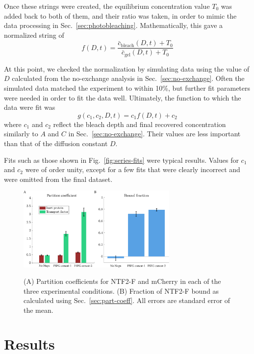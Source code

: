 Once these strings were created, the equilibrium concentration value $T_0$ was added back to both of them, and their ratio was taken, in order to mimic the data processing in Sec.~\ref{sec:photobleaching}.  Mathematically, this gave a normalized string of
\begin{equation}
f(D,t) = \frac{\bar{c}_\mathrm{bleach}(D,t)+T_0}{\bar{c}_\mathrm{gel}(D,t)+T_0}
\end{equation}

At this point, we checked the normalization by simulating data using the value of $D$ calculated from the no-exchange analysis in Sec.~\ref{sec:no-exchange}.  Often the simulated data matched the experiment to within 10\%, but further fit parameters were needed in order to fit the data well.  Ultimately, the function to which the data were fit was
\begin{equation}
g(c_1,c_2,D,t) = c_1f(D,t) + c_2
\end{equation}
where $c_1$ and $c_2$ reflect the bleach depth and final recovered concentration similarly to $A$ and $C$ in Sec.~\ref{sec:no-exchange}.  Their values are less important than that of the diffusion constant $D$.

Fits such as those shown in Fig.~\ref{fig:series-fits} were typical results.  Values for $c_1$ and $c_2$ were of order unity, except for a few fits that were clearly incorrect and were omitted from the final dataset.

\begin{figure}
\caption[Partition coefficients and fraction of NTF2 bound.]{(A) Partition coefficients for NTF2-F and mCherry in each of the three experimental conditions.  (B) Fraction of NTF2-F bound as calculated using Sec.~\ref{sec:part-coeff}.  All errors are standard error of the mean.}
\centering
\includegraphics[width=0.7\textwidth]{figs/ch04/fraction-bound}
\label{fig:frac-bound}
\end{figure} 
\section{Results}

